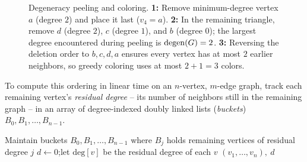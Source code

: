 \begin{figure}[htbp]
\caption{Degeneracy peeling and coloring. \textbf{1:} Remove minimum-degree vertex $a$ (degree $2$) and place it last ($v_4=a$). \textbf{2:} In the remaining triangle, remove $d$ (degree $2$), $c$ (degree $1$), and $b$ (degree $0$); the largest degree encountered during peeling is $\operatorname{degen}(G)=2$. \textbf{3:} Reversing the deletion order to $b,c,d,a$ ensures every vertex has at most $2$ earlier neighbors, so greedy coloring uses at most $2+1=3$ colors.}
\label{ch28:fig-degen-peeling}
\end{figure}

To compute this ordering in linear time on an $n$-vertex, $m$-edge graph, track each remaining vertex's \emph{residual degree} -- its number of neighbors still in the remaining graph -- in an array of degree-indexed doubly linked lists (\emph{buckets}) $B_0, B_1, \dots, B_{n-1}$.

\begin{algorithm}[H]
\caption{\textsc{DegeneracyOrder}$(\Gph)$ -- smallest-last ordering}
\label{ch28:alg-degen}
Maintain buckets $B_0,B_1,\dots,B_{n-1}$ where $B_j$ holds remaining vertices of residual degree $j$\;
$d \leftarrow 0$;\quad let $\mathrm{deg}[v]$ be the residual degree of each $v$\;
\Return $(v_1,\dots,v_n),\ d$\;
\end{algorithm}


